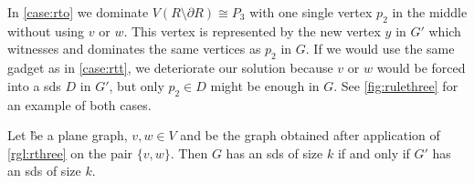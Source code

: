 In \cref{case:rto} we dominate $V(R \setminus \partial R) \cong P_3$ with one single vertex $p_2$ in the middle without using $v$ or $w$.
This vertex is represented by the new vertex $y$ in $G'$ which witnesses and dominates the same vertices as $p_2$ in $G$.
If we would use the same gadget as in \cref{case:rtt}, we deteriorate our solution because  $v$ or $w$ would be forced into a sds $D$ in $G'$, but only $p_2 \in D$ might be enough in $G$.
See \cref{fig:rulethree} for an example of both cases.

\begin{lemma}\label{lemma:correctnessthree}
    Let \G be a plane graph, $v, w \in V$ and \GB be the graph obtained after application of \cref{rgl:rthree} on the pair $\{v, w\}$. 
    Then $G$ has an sds of size $k$ if and only if $G'$ has an sds of size $k$.
\end{lemma}
